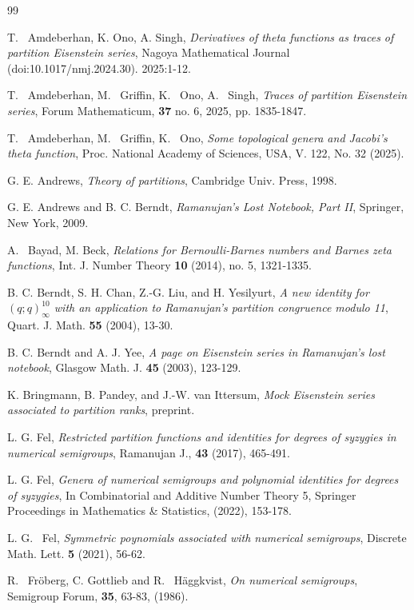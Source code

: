 \documentclass[11pt]{amsart}
\theoremstyle{definition}
\theoremstyle{remark}
\numberwithin{equation}{section}
\begin{document}
\begin{thebibliography}{99}


 T. ~Amdeberhan, K. Ono, A. Singh,
\emph{Derivatives of theta functions as traces of partition Eisenstein series}, 
Nagoya Mathematical Journal  (doi:10.1017/nmj.2024.30). 2025:1-12.

 T. ~Amdeberhan, M. ~Griffin, K. ~Ono, A. ~Singh, 
\emph{Traces of partition Eisenstein series}, 
Forum Mathematicum, {\bf 37} no. 6, 2025, pp. 1835-1847. 

 T. ~Amdeberhan, M. ~Griffin, K. ~Ono, 
\emph{Some topological genera and Jacobi's theta function}, 
Proc. National Academy of Sciences,  USA, V. 122, No. 32 (2025).

 G. E. Andrews, \emph{Theory of partitions}, Cambridge Univ. Press, 1998.

 G. E. Andrews and B. C. Berndt, \emph{Ramanujan's Lost Notebook, Part II}, Springer, New York, 2009.

 A. ~Bayad, M. Beck,
\emph{Relations for Bernoulli-Barnes numbers and Barnes zeta functions},
Int. J. Number Theory {\bf 10} (2014), no. 5, 1321-1335.

 B. C. Berndt, S. H. Chan, Z.-G. Liu, and H. Yesilyurt, \emph{A new identity for $(q;q)_{\infty}^{10}$ with an application to Ramanujan's partition congruence modulo 11},  Quart. J. Math. \textbf{55} (2004), 13-30.


 B. C. Berndt and A. J. Yee, \emph{A page on Eisenstein series in Ramanujan's lost notebook}, Glasgow Math. J. \textbf{45} (2003), 123-129.

 K. Bringmann, B. Pandey, and J.-W. van Ittersum, \emph{Mock Eisenstein series associated to partition ranks}, preprint.


 L. G. Fel, 
\emph{Restricted partition functions and identities for degrees of syzygies in numerical semigroups}, 
Ramanujan J., {\bf 43} (2017), 465-491.

 L. G. Fel,
\emph{Genera of numerical semigroups  and polynomial identities for degrees of syzygies}, 
In Combinatorial and Additive Number Theory 5, 
Springer Proceedings in Mathematics \& Statistics, (2022), 153-178.

 L. G. ~Fel,
\emph{Symmetric poynomials associated with numerical semigroups},
Discrete Math. Lett. {\bf 5} (2021), 56-62.

 R. ~Fr\"oberg, C. Gottlieb and R. ~H\"aggkvist, 
\emph{On numerical semigroups}, Semigroup Forum, {\bf 35}, 63-83, (1986).


\end{thebibliography}
\end{document}
